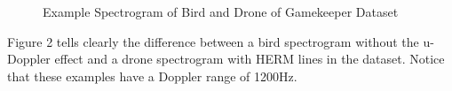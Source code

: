 \documentclass{cta-author}
\begin{document}
\begin{figure}[h]
\centering
{}
\caption{Example Spectrogram of Bird and Drone of Gamekeeper Dataset}
\end{figure}
Figure 2 tells clearly the difference between a bird spectrogram without the u-Doppler effect and a drone spectrogram with HERM lines in the dataset. Notice that these examples have a Doppler range of 1200Hz.
\end{document}
